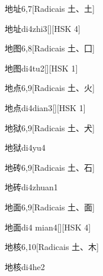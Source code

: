 \begin{entry}{地址}{6,7}[Radicais ⼟、⼟]
  \begin{phonetics}{地址}{di4zhi3}[][HSK 4]
  \end{phonetics}
\end{entry}

\begin{entry}{地图}{6,8}[Radicais ⼟、⼞]
  \begin{phonetics}{地图}{di4tu2}[][HSK 1]
  \end{phonetics}
\end{entry}

\begin{entry}{地点}{6,9}[Radicais ⼟、⽕]
  \begin{phonetics}{地点}{di4dian3}[][HSK 1]
  \end{phonetics}
\end{entry}

\begin{entry}{地狱}{6,9}[Radicais ⼟、⽝]
  \begin{phonetics}{地狱}{di4yu4}
  \end{phonetics}
\end{entry}

\begin{entry}{地砖}{6,9}[Radicais ⼟、⽯]
  \begin{phonetics}{地砖}{di4zhuan1}
  \end{phonetics}
\end{entry}

\begin{entry}{地面}{6,9}[Radicais ⼟、⾯]
  \begin{phonetics}{地面}{di4 mian4}[][HSK 4]
  \end{phonetics}
\end{entry}

\begin{entry}{地核}{6,10}[Radicais ⼟、⽊]
  \begin{phonetics}{地核}{di4he2}
  \end{phonetics}
\end{entry}

